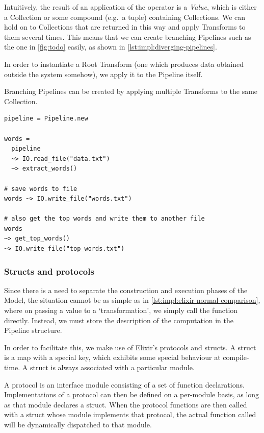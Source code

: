 Intuitively, the result of an application of the \exs{~>} operator is a \emph{Value}, which is either a Collection or some compound (e.g.\ a tuple) containing Collections.
We can hold on to Collections that are returned in this way and apply Transforms to them several times.
This means that we can create branching Pipelines such as the one in \cref{fig:todo} easily, as shown in \cref{lst:impl:diverging-pipelines}.

In order to instantiate a Root Transform (one which produces data obtained outside the system somehow), we apply it to the Pipeline itself.

\begin{listing}[h]
	\caption{Branching Pipelines can be created by applying multiple Transforms to the same Collection.}
	\label{lst:impl:diverging-pipelines}
	\begin{verbatim}
pipeline = Pipeline.new

words =
  pipeline
  ~> IO.read_file("data.txt")
  ~> extract_words()
  
# save words to file
words ~> IO.write_file("words.txt")

# also get the top words and write them to another file
words
~> get_top_words()
~> IO.write_file("top_words.txt")
	\end{verbatim}
\end{listing}

\subsubsection{Structs and protocols}

Since there is a need to separate the construction and execution phases of the Model, the situation cannot be as simple as in \cref{lst:impl:elixir-normal-comparison}, where on passing a value to a `transformation', we simply call the function directly.
Instead, we must store the description of the computation in the Pipeline structure.

In order to facilitate this, we make use of Elixir's protocols and structs.
A struct is a map with a special  key, which exhibits some special behaviour at compile-time.
A struct is always associated with a particular module.

A protocol is an interface module consisting of a set of function declarations.
Implementations of a protocol can then be defined on a per-module basis, as long as that module declares a struct.
When the protocol functions are then called with a struct whose module implements that protocol, the actual function called will be dynamically dispatched to that module.

